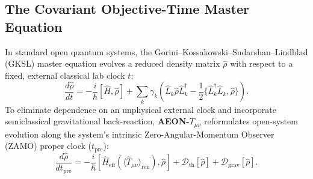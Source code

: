 \documentclass[11pt,a4paper]{article}
\begin{document}
\subsection{The Covariant Objective-Time Master Equation}
In standard open quantum systems, the Gorini--Kossakowski--Sudarshan--Lindblad (GKSL) master equation evolves a reduced density matrix $\hat{\rho}$ with respect to a fixed, external classical lab clock $t$:
\begin{equation}
\frac{d\hat{\rho}}{dt} = -\frac{i}{\hbar}[\hat{H}, \hat{\rho}] + \sum_k \gamma_k \left(\hat{L}_k \hat{\rho} \hat{L}_k^\dagger - \frac{1}{2}\{\hat{L}_k^\dagger \hat{L}_k, \hat{\rho}\}\right).
\end{equation}
To eliminate dependence on an unphysical external clock and incorporate semiclassical gravitational back-reaction, \textbf{AEON-$T_{\mu\nu}$} reformulates open-system evolution along the system's intrinsic Zero-Angular-Momentum Observer (ZAMO) proper clock ($t_{\text{pre}}$):
\begin{equation}
\frac{d\hat{\rho}}{dt_{\text{pre}}} = -\frac{i}{\hbar}\left[\hat{H}_{\text{eff}}\!\left(\langle \hat{T}_{\mu\nu}\rangle_{\text{ren}}\right), \hat{\rho}\right] + \mathcal{D}_{\text{th}}[\hat{\rho}] + \mathcal{D}_{\text{grav}}[\hat{\rho}].
\label{eq:master_aeon}
\end{equation}
\end{document}
